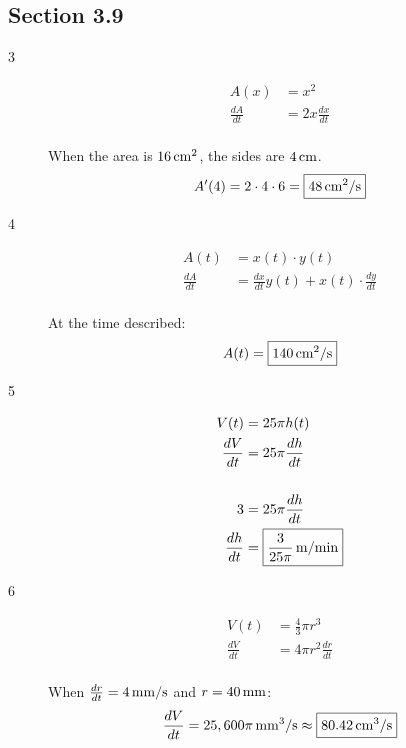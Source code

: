 \documentclass[letterpaper, landscape]{exam}
\begin{document}
  \subsection{Section 3.9}
  \begin{description}

    \item[3]
      \begin{align*}
        A(x)          & = x^2 \\
        \frac{dA}{dt} & = 2x \frac{dx}{dt} \\
      \end{align*}

      When the area is $\unit[16]{cm^2}$, the sides are $\unit[4]{cm}$.
      \[
        A'(4) = 2 \cdot 4 \cdot 6 = \boxed{ \unit[48]{cm^2/s} }
      \]

    \newpage

    \item[4]
      \begin{align*}
        A(t)          & = x(t) \cdot y(t) \\
        \frac{dA}{dt} & = \frac{dx}{dt} y(t) + x(t) \cdot \frac{dy}{dt} \\
      \end{align*}

      At the time described:
      \[
        A(t) = \boxed{ \unit[140]{cm^2/s} }
      \]

    \item[5]
      \begin{align*}
        V(t)          & = 25 \pi h(t) \\
        \frac{dV}{dt} & = 25 \pi \frac{dh}{dt} \\
        \\
        3             & = 25 \pi \frac{dh}{dt} \\
        \frac{dh}{dt} & = \boxed{ \unit[\frac{3}{25 \pi}]{m/min} } \\
      \end{align*}

    \item[6]
      \begin{align*}
        V(t)          & = \frac{4}{3} \pi r^3 \\
        \frac{dV}{dt} & = 4 \pi r^2 \frac{dr}{dt} \\
      \end{align*}

      When $\frac{dr}{dt} = \unit[4]{mm/s}$ and $r = \unit[40]{mm}$:
      \[
        \frac{dV}{dt} = \unit[25,600 \pi]{mm^3/s} \approx \boxed{ \unit[80.42]{cm^3/s} }
      \]


\end{description}
\end{document}
